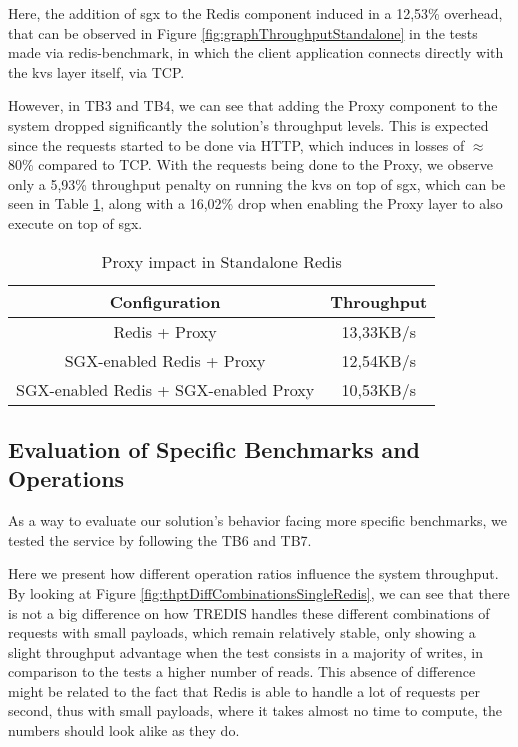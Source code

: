 Here, the addition of \gls{sgx} to the Redis component induced in a 12,53\% overhead, that can be observed in Figure \ref{fig:graphThroughputStandalone} in the tests made via redis-benchmark, in which the client application connects directly with the \gls{kvs} layer itself, via TCP. 

However, in TB3 and TB4, we can see that adding the Proxy component to the system dropped significantly the solution's throughput levels. This is expected since the requests started to be done via HTTP, which induces in losses of $\approx$80\% compared to TCP. With the requests being done to the Proxy, we observe only a 5,93\% throughput penalty on running the \gls{kvs} on top of \gls{sgx}, which can be seen in Table \ref{table:throughputSingleRedis}, along with a 16,02\% drop when enabling the Proxy layer to also execute on top of \gls{sgx}.


\begin{table}[ht]
	\caption{Proxy impact in Standalone Redis} %
	\centering %
	\begin{tabular}{c c} %
		\hline\hline %
		\textbf{Configuration} & \textbf{Throughput} \\ [0.5ex] %
		\hline
		Redis + Proxy & 13,33KB/s\\
		\hline
		SGX-enabled Redis + Proxy & 12,54KB/s \\
		\hline %
		SGX-enabled Redis + SGX-enabled Proxy & 10,53KB/s\\ [1ex] %
		\hline %
	\end{tabular}
	\label{table:throughputSingleRedis} %
\end{table}



\subsection{Evaluation of Specific Benchmarks and Operations}
\label{ssec:specificBenchmarksRedisS}

As a way to evaluate our solution's behavior facing more specific benchmarks, we tested the service by following the TB6 and TB7. 

Here we present how different operation ratios influence the system throughput. By looking at Figure \ref{fig:thptDiffCombinationsSingleRedis}, we can see that there is not a big difference on how TREDIS handles these different combinations of requests with small payloads, which remain relatively stable, only showing a slight throughput advantage when the test consists in a majority of writes, in comparison to the tests a higher number of reads. This absence of difference might be related to the fact that Redis is able to handle a lot of requests per second, thus with small payloads, where it takes almost no time to compute, the numbers should look alike as they do.  

